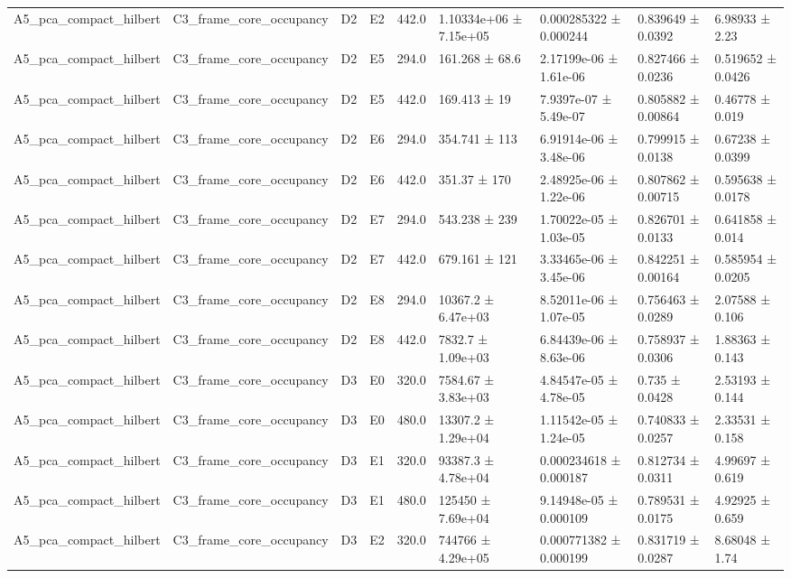\begin{table}
\begin{tabular}{lllllllll}
A5\_pca\_compact\_hilbert & C3\_frame\_core\_occupancy & D2 & E2 & 442.0 & 1.10334e+06 ± 7.15e+05 & 0.000285322 ± 0.000244 & 0.839649 ± 0.0392 & 6.98933 ± 2.23 \\
A5\_pca\_compact\_hilbert & C3\_frame\_core\_occupancy & D2 & E5 & 294.0 & 161.268 ± 68.6 & 2.17199e-06 ± 1.61e-06 & 0.827466 ± 0.0236 & 0.519652 ± 0.0426 \\
A5\_pca\_compact\_hilbert & C3\_frame\_core\_occupancy & D2 & E5 & 442.0 & 169.413 ± 19 & 7.9397e-07 ± 5.49e-07 & 0.805882 ± 0.00864 & 0.46778 ± 0.019 \\
A5\_pca\_compact\_hilbert & C3\_frame\_core\_occupancy & D2 & E6 & 294.0 & 354.741 ± 113 & 6.91914e-06 ± 3.48e-06 & 0.799915 ± 0.0138 & 0.67238 ± 0.0399 \\
A5\_pca\_compact\_hilbert & C3\_frame\_core\_occupancy & D2 & E6 & 442.0 & 351.37 ± 170 & 2.48925e-06 ± 1.22e-06 & 0.807862 ± 0.00715 & 0.595638 ± 0.0178 \\
A5\_pca\_compact\_hilbert & C3\_frame\_core\_occupancy & D2 & E7 & 294.0 & 543.238 ± 239 & 1.70022e-05 ± 1.03e-05 & 0.826701 ± 0.0133 & 0.641858 ± 0.014 \\
A5\_pca\_compact\_hilbert & C3\_frame\_core\_occupancy & D2 & E7 & 442.0 & 679.161 ± 121 & 3.33465e-06 ± 3.45e-06 & 0.842251 ± 0.00164 & 0.585954 ± 0.0205 \\
A5\_pca\_compact\_hilbert & C3\_frame\_core\_occupancy & D2 & E8 & 294.0 & 10367.2 ± 6.47e+03 & 8.52011e-06 ± 1.07e-05 & 0.756463 ± 0.0289 & 2.07588 ± 0.106 \\
A5\_pca\_compact\_hilbert & C3\_frame\_core\_occupancy & D2 & E8 & 442.0 & 7832.7 ± 1.09e+03 & 6.84439e-06 ± 8.63e-06 & 0.758937 ± 0.0306 & 1.88363 ± 0.143 \\
A5\_pca\_compact\_hilbert & C3\_frame\_core\_occupancy & D3 & E0 & 320.0 & 7584.67 ± 3.83e+03 & 4.84547e-05 ± 4.78e-05 & 0.735 ± 0.0428 & 2.53193 ± 0.144 \\
A5\_pca\_compact\_hilbert & C3\_frame\_core\_occupancy & D3 & E0 & 480.0 & 13307.2 ± 1.29e+04 & 1.11542e-05 ± 1.24e-05 & 0.740833 ± 0.0257 & 2.33531 ± 0.158 \\
A5\_pca\_compact\_hilbert & C3\_frame\_core\_occupancy & D3 & E1 & 320.0 & 93387.3 ± 4.78e+04 & 0.000234618 ± 0.000187 & 0.812734 ± 0.0311 & 4.99697 ± 0.619 \\
A5\_pca\_compact\_hilbert & C3\_frame\_core\_occupancy & D3 & E1 & 480.0 & 125450 ± 7.69e+04 & 9.14948e-05 ± 0.000109 & 0.789531 ± 0.0175 & 4.92925 ± 0.659 \\
A5\_pca\_compact\_hilbert & C3\_frame\_core\_occupancy & D3 & E2 & 320.0 & 744766 ± 4.29e+05 & 0.000771382 ± 0.000199 & 0.831719 ± 0.0287 & 8.68048 ± 1.74 \\

\end{tabular}
\end{table}
